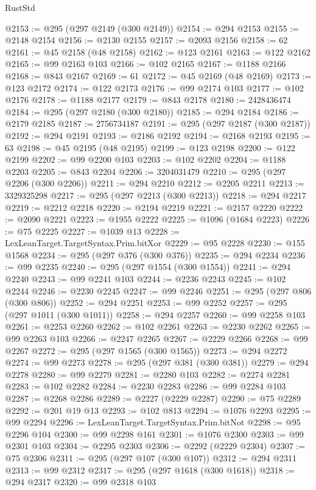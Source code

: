 \begin{lexlean}{RustStd}
\begin{coremodule}
{\begin{coremodule}
{{{{{{{{{{{{{{{{{{{{{{{{{{{{{{{{{@2153 := @295 (@297 @2149 (@300 @2149))
@2154 := @294 @2153
@2155 := @2148 @2154
@2156 := @2130 @2155
@2157 := @2093 @2156
@2158 := 62
@2161 := @45 @2158 (@48 @2158)
@2162 := @123 @2161
@2163 := @122 @2162
@2165 := @99 @2163 @103
@2166 := @102 @2165
@2167 := @1188 @2166
@2168 := @843 @2167
@2169 := 61
@2172 := @45 @2169 (@48 @2169)
@2173 := @123 @2172
@2174 := @122 @2173
@2176 := @99 @2174 @103
@2177 := @102 @2176
@2178 := @1188 @2177
@2179 := @843 @2178
@2180 := 2428436474
@2184 := @295 (@297 @2180 (@300 @2180))
@2185 := @294 @2184
@2186 := @2179 @2185
@2187 := 2756734187
@2191 := @295 (@297 @2187 (@300 @2187))
@2192 := @294 @2191
@2193 := @2186 @2192
@2194 := @2168 @2193
@2195 := 63
@2198 := @45 @2195 (@48 @2195)
@2199 := @123 @2198
@2200 := @122 @2199
@2202 := @99 @2200 @103
@2203 := @102 @2202
@2204 := @1188 @2203
@2205 := @843 @2204
@2206 := 3204031479
@2210 := @295 (@297 @2206 (@300 @2206))
@2211 := @294 @2210
@2212 := @2205 @2211
@2213 := 3329325298
@2217 := @295 (@297 @2213 (@300 @2213))
@2218 := @294 @2217
@2219 := @2212 @2218
@2220 := @2194 @2219
@2221 := @2157 @2220
@2222 := @2090 @2221
@2223 := @1955 @2222
@2225 := @1096 (@1684 @2223)
@2226 := @75 @2225
@2227 := @1039 @13
@2228 := LexLeanTarget.TargetSyntax.Prim.bitXor
@2229 := @95 @2228
@2230 := @155 @1568
@2234 := @295 (@297 @376 (@300 @376))
@2235 := @294 @2234
@2236 := @99 @2235
@2240 := @295 (@297 @1554 (@300 @1554))
@2241 := @294 @2240
@2243 := @99 @2241 @103
@2244 := @2236 @2243
@2245 := @102 @2244
@2246 := @2230 @2245
@2247 := @99 @2246
@2251 := @295 (@297 @806 (@300 @806))
@2252 := @294 @2251
@2253 := @99 @2252
@2257 := @295 (@297 @1011 (@300 @1011))
@2258 := @294 @2257
@2260 := @99 @2258 @103
@2261 := @2253 @2260
@2262 := @102 @2261
@2263 := @2230 @2262
@2265 := @99 @2263 @103
@2266 := @2247 @2265
@2267 := @2229 @2266
@2268 := @99 @2267
@2272 := @295 (@297 @1565 (@300 @1565))
@2273 := @294 @2272
@2274 := @99 @2273
@2278 := @295 (@297 @381 (@300 @381))
@2279 := @294 @2278
@2280 := @99 @2279
@2281 := @2280 @103
@2282 := @2274 @2281
@2283 := @102 @2282
@2284 := @2230 @2283
@2286 := @99 @2284 @103
@2287 := @2268 @2286
@2289 := @2227 (@2229 @2287)
@2290 := @75 @2289
@2292 := @201 @19 @13
@2293 := @102 @813
@2294 := @1076 @2293
@2295 := @99 @2294
@2296 := LexLeanTarget.TargetSyntax.Prim.bitNot
@2298 := @95 @2296 @104
@2300 := @99 @2298 @161
@2301 := @1076 @2300
@2303 := @99 @2301 @103
@2304 := @2295 @2303
@2306 := @2292 (@2229 @2304)
@2307 := @75 @2306
@2311 := @295 (@297 @107 (@300 @107))
@2312 := @294 @2311
@2313 := @99 @2312
@2317 := @295 (@297 @1618 (@300 @1618))
@2318 := @294 @2317
@2320 := @99 @2318 @103
}}}}}}}}}}}}}}}}}}}}}}}}}}}}}}}}}
\end{coremodule}}
\end{coremodule}
\end{lexlean}
